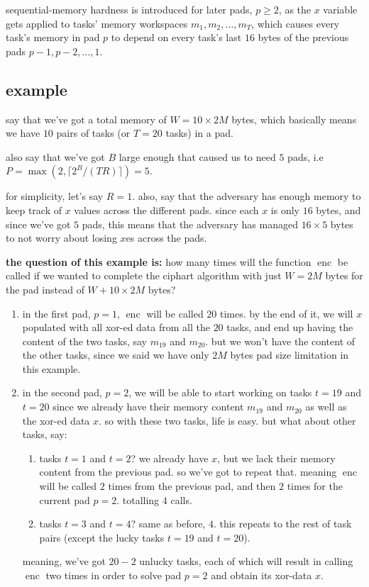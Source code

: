 \documentclass{article}
\DeclareMathOperator{\enc}{enc}
\DeclareMathOperator{\maxf}{max}
\begin{document}
\begin{multicols}{2}
sequential-memory hardness is introduced for later pads, $p \ge 2$, as the
$x$ variable gets applied to tasks' memory workspaces $m_1, m_2, \ldots,
m_T$, which causes every task's memory in pad $p$ to depend on every task's
last $16$ bytes of the previous pads $p-1, p-2, \ldots, 1$.

\subsection{example}
say that we've got a total memory of $W = 10 \times 2M$ bytes, which
basically means we have $10$ pairs of tasks (or $T=20$ tasks) in a pad.

also say that we've got $B$ large enough that caused us to need $5$ pads,
i.e $P=\maxf(2, \lceil 2^B / (TR)\rceil)=5$.

for simplicity, let's say $R=1$.  also, say that the adversary has enough
memory to keep track of $x$ values across the different pads.  since each
$x$ is only $16$ bytes, and since we've got $5$ pads, this means that the
adversary has managed $16\times 5$ bytes to not worry about losing $x$es
across the pads.

\textbf{the question of this example is:} how many times will the function
$\enc$ be called if we wanted to complete the ciphart algorithm with just
$W=2M$ bytes for the pad instead of $W+10 \times 2M$ bytes?

\begin{enumerate}
    \item in the first pad, $p=1$, $\enc$ will be called $20$ times.  by
    the end of it, we will $x$ populated with all xor-ed data from all the
    $20$ tasks, and end up having the content of the two tasks, say
    $m_{19}$ and $m_{20}$.  but we won't have the content of the other
    tasks, since we said we have only $2M$ bytes pad size limitation in
    this example.
    \item in the second pad, $p=2$, we will be able to start working on
    tasks $t=19$ and $t=20$ since we already have their memory content
    $m_{19}$ and $m_{20}$ as well as the xor-ed data $x$.  so with these
    two tasks, life is easy.  but what about other tasks, say:
        \begin{enumerate}
            \item tasks $t=1$ and $t=2$?  we already have $x$, but we lack
            their memory content from the previous pad.  so we've got to
            repeat that.  meaning $\enc$ will be called $2$ times from the
            previous pad, and then $2$ times for the current pad $p=2$.
            totalling $4$ calls.  \item tasks $t=3$ and $t=4$?  same as
            before, $4$.  this repeats to the rest of task pairs (except
            the lucky tasks $t=19$ and $t=20$).
        \end{enumerate}
        meaning, we've got $20-2$ unlucky tasks, each of which will result
        in calling $\enc$ two times in order to solve pad $p=2$ and obtain
        its xor-data $x$.


\end{enumerate}
\end{multicols}
\end{document}
